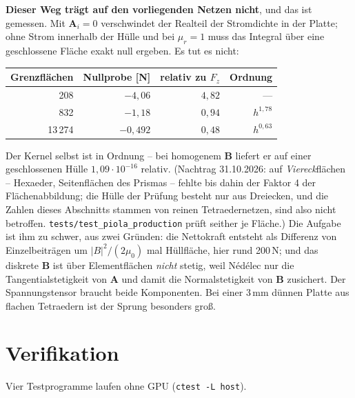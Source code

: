 \documentclass[11pt,a4paper]{article}
\newcommand{\Ai}{\mathbf{A}_i}
\begin{document}
\textbf{Dieser Weg trägt auf den vorliegenden Netzen nicht}, und das ist
gemessen. Mit $\Ai = 0$ verschwindet der Realteil der Stromdichte in der
Platte; ohne Strom innerhalb der Hülle und bei $\mu_r = 1$ muss das Integral
über eine geschlossene Fläche exakt null ergeben. Es tut es nicht:

\begin{center}
\begin{tabular}{rrrr}
\toprule
Grenzflächen & Nullprobe [N] & relativ zu $F_z$ & Ordnung \\
\midrule
  208 & $-4{,}06$  & $4{,}82$ & --- \\
  832 & $-1{,}18$  & $0{,}94$ & $h^{1{,}78}$ \\
13\,274 & $-0{,}492$ & $0{,}48$ & $h^{0{,}63}$ \\
\bottomrule
\end{tabular}
\end{center}

Der Kernel selbst ist in Ordnung -- bei homogenem $\mathbf{B}$ liefert er auf
einer geschlossenen Hülle $1{,}09\cdot10^{-16}$ relativ. (Nachtrag
31.10.2026: auf \emph{Viereck}flächen -- Hexaeder, Seitenflächen des
Prismas -- fehlte bis dahin der Faktor 4 der Flächenabbildung; die Hülle der
Prüfung besteht nur aus Dreiecken, und die Zahlen dieses Abschnitts stammen
von reinen Tetraedernetzen, sind also nicht betroffen.
\texttt{tests/test\_piola\_production} prüft seither je Fläche.) Die Aufgabe ist ihm
zu schwer, aus zwei Gründen: die Nettokraft entsteht als Differenz von
Einzelbeiträgen um $|B|^2/(2\mu_0)$ mal Hüllfläche, hier rund 200\,N;
und das diskrete $\mathbf{B}$ ist über Elementflächen \emph{nicht} stetig, weil
Nédélec nur die Tangentialstetigkeit von $\mathbf{A}$ und damit die
Normalstetigkeit von $\mathbf{B}$ zusichert. Der Spannungstensor braucht beide
Komponenten. Bei einer 3\,mm dünnen Platte aus flachen Tetraedern ist der
Sprung besonders groß.

\section{Verifikation}
\label{sec:verifikation}

Vier Testprogramme laufen ohne GPU (\texttt{ctest -L host}).
\end{document}
